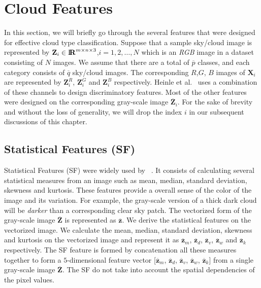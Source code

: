 \section{Cloud Features}
\label{sec:chap6-features}
In this section, we will briefly go through the several features that were designed for effective cloud type classification. Suppose that a sample sky/cloud image is represented by $\mathbf{Z}_i \in {\rm I\!\mathbf{R}}^{m \times n \times 3}$,$i=1,2,\ldots,N$ which is an \emph{RGB} image in a dataset consisting of $N$ images. We assume that there are a total of $\overline{p}$ classes, and each category consists of $\overline{q}$ sky/cloud images. The corresponding $R$,$G$, $B$ images of $\mathbf{X}_i$ are represented by $\mathbf{Z}_i^{R}$, $\mathbf{Z}_i^{G}$ and $\mathbf{Z}_i^{B}$ respectively. Heinle et al.\ \cite{Heinle2010} uses a combination of these channels to design discriminatory features. Most of the other features were designed on the corresponding gray-scale image $\overline{\mathbf{Z}}_i$. For the sake of brevity and without the loss of generality, we will drop the index $i$ in our subsequent discussions of this chapter. 

\subsection{Statistical Features (SF)}
Statistical Features (SF) were widely used by ~\cite{cloud_LBP,satellite03}. It consists of calculating several statistical measures from an image such as mean, median, standard deviation, skewness and kurtosis. These features provide a overall sense of the color of the image and its variation. For example, the gray-scale version of a thick dark cloud will be \emph{darker} than a corresponding clear sky patch. The vectorized form of the gray-scale image $\overline{\mathbf{Z}}$ is represented as $\overline{\mathbf{z}}$. We derive the statistical features on the vectorized image. We calculate the mean, median, standard deviation, skewness and kurtosis on the vectorized image and represent it as $\overline{\mathbf{z}}_m$, $\overline{\mathbf{z}}_d$, $\overline{\mathbf{z}}_v$, $\overline{\mathbf{z}}_w$ and $\overline{\mathbf{z}}_k$ respectively. The SF feature is formed by concatenation all these measures together to form a $5$-dimensional feature vector [$\overline{\mathbf{z}}_m$, $\overline{\mathbf{z}}_d$, $\overline{\mathbf{z}}_v$, $\overline{\mathbf{z}}_w$, $\overline{\mathbf{z}}_k$] from a single gray-scale image $\overline{\mathbf{Z}}$. The SF do not take into account the spatial dependencies of the pixel values.

